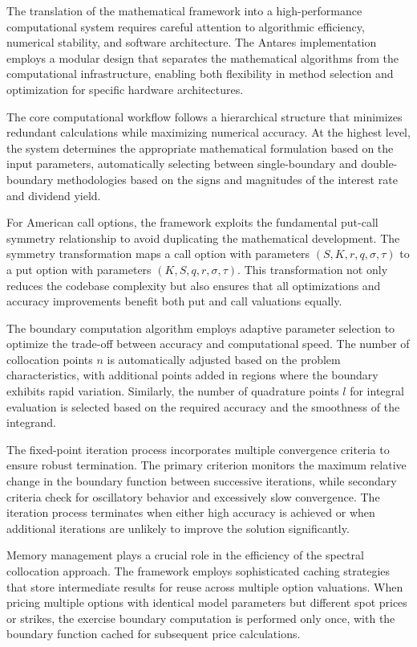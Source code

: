 \documentclass[
  american,
  11pt,
  11pt,
  letterpaper,
  onecolumn]{article}
\begin{document}
The translation of the mathematical framework into a high-performance
computational system requires careful attention to algorithmic
efficiency, numerical stability, and software architecture. The Antares
implementation employs a modular design that separates the mathematical
algorithms from the computational infrastructure, enabling both
flexibility in method selection and optimization for specific hardware
architectures.

The core computational workflow follows a hierarchical structure that
minimizes redundant calculations while maximizing numerical accuracy. At
the highest level, the system determines the appropriate mathematical
formulation based on the input parameters, automatically selecting
between single-boundary and double-boundary methodologies based on the
signs and magnitudes of the interest rate and dividend yield.

For American call options, the framework exploits the fundamental
put-call symmetry relationship to avoid duplicating the mathematical
development. The symmetry transformation maps a call option with
parameters \((S, K, r, q, \sigma, \tau)\) to a put option with
parameters \((K, S, q, r, \sigma, \tau)\). This transformation not only
reduces the codebase complexity but also ensures that all optimizations
and accuracy improvements benefit both put and call valuations equally.

The boundary computation algorithm employs adaptive parameter selection
to optimize the trade-off between accuracy and computational speed. The
number of collocation points \(n\) is automatically adjusted based on
the problem characteristics, with additional points added in regions
where the boundary exhibits rapid variation. Similarly, the number of
quadrature points \(l\) for integral evaluation is selected based on the
required accuracy and the smoothness of the integrand.

The fixed-point iteration process incorporates multiple convergence
criteria to ensure robust termination. The primary criterion monitors
the maximum relative change in the boundary function between successive
iterations, while secondary criteria check for oscillatory behavior and
excessively slow convergence. The iteration process terminates when
either high accuracy is achieved or when additional iterations are
unlikely to improve the solution significantly.

Memory management plays a crucial role in the efficiency of the spectral
collocation approach. The framework employs sophisticated caching
strategies that store intermediate results for reuse across multiple
option valuations. When pricing multiple options with identical model
parameters but different spot prices or strikes, the exercise boundary
computation is performed only once, with the boundary function cached
for subsequent price calculations.
\end{document}
